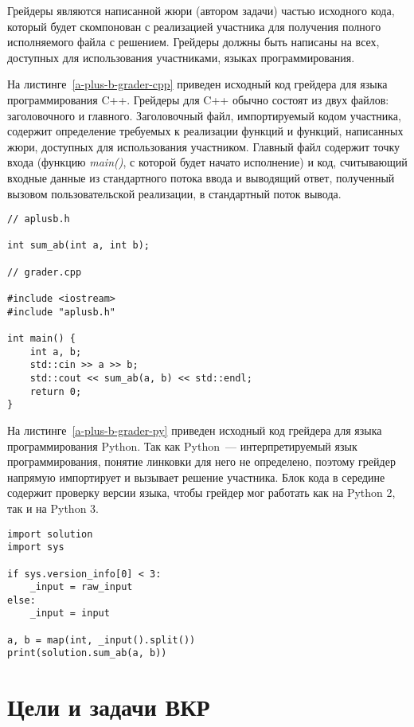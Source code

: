 \documentclass[times,specification,annotation]{style/itmo-student-thesis/itmo-student-thesis}
\begin{document}
Грейдеры являются написанной жюри (автором задачи) частью исходного кода, который будет скомпонован с реализацией участника для получения полного исполняемого файла с решением. Грейдеры должны быть написаны на всех, доступных для использования участниками, языках программирования. 

На листинге~\ref{a-plus-b-grader-cpp} приведен исходный код грейдера для языка программирования C++. Грейдеры для C++ обычно состоят из двух файлов: заголовочного и главного. Заголовочный файл, импортируемый кодом участника, содержит определение требуемых к реализации функций и функций, написанных жюри, доступных для использования участником. Главный файл содержит точку входа (функцию \textit{main()}, с которой будет начато исполнение) и код, считывающий входные данные из стандартного потока ввода и выводящий ответ, полученный вызовом пользовательской реализации, в стандартный поток вывода.

\begin{lstlisting}[float=!h,caption={Пример грейдера для языка C++},label={a-plus-b-grader-cpp}]
// aplusb.h

int sum_ab(int a, int b);

// grader.cpp

#include <iostream>
#include "aplusb.h"
 
int main() {
    int a, b;
    std::cin >> a >> b;
    std::cout << sum_ab(a, b) << std::endl;
    return 0;
}
\end{lstlisting}

На листинге~\ref{a-plus-b-grader-py} приведен исходный код грейдера для языка программирования Python. Так как Python~--- интерпретируемый язык программирования, понятие линковки для него не определено, поэтому грейдер напрямую импортирует и вызывает решение участника. Блок кода в середине содержит проверку версии языка, чтобы грейдер мог работать как на Python 2, так и на Python 3.

\begin{lstlisting}[float=!h,caption={Пример грейдера для языка Python},label={a-plus-b-grader-py}]
import solution
import sys

if sys.version_info[0] < 3:
    _input = raw_input
else:
    _input = input
 
a, b = map(int, _input().split())
print(solution.sum_ab(a, b))
\end{lstlisting}

\section{Цели и задачи ВКР}
\end{document}
